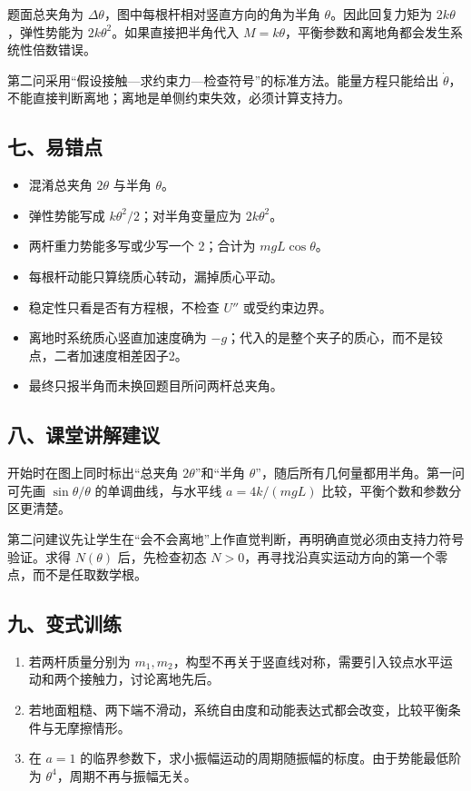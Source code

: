 \documentclass[12pt,a4paper,UTF8]{ctexart}
\newcommand{\tightlist}{\setlength{\itemsep}{0pt}\setlength{\parskip}{0pt}}
\begin{document}
题面总夹角为 \(\Delta\theta\)，图中每根杆相对竖直方向的角为半角
\(\theta\)。因此回复力矩为 \(2k\theta\)，弹性势能为
\(2k\theta^2\)。如果直接把半角代入
\(M=k\theta\)，平衡参数和离地角都会发生系统性倍数错误。

第二问采用``假设接触---求约束力---检查符号''的标准方法。能量方程只能给出
\(\dot\theta\)，不能直接判断离地；离地是单侧约束失效，必须计算支持力。

\subsection{七、易错点}\label{ux4e03ux6613ux9519ux70b9-7}

\begin{itemize}
\tightlist
\item
  混淆总夹角 \(2\theta\) 与半角 \(\theta\)。
\item
  弹性势能写成 \(k\theta^2/2\)；对半角变量应为 \(2k\theta^2\)。
\item
  两杆重力势能多写或少写一个 2；合计为 \(mgL\cos\theta\)。
\item
  每根杆动能只算绕质心转动，漏掉质心平动。
\item
  稳定性只看是否有方程根，不检查 \(U''\) 或受约束边界。
\item
  离地时系统质心竖直加速度确为
  \(-g\)；代入的是整个夹子的质心，而不是铰点，二者加速度相差因子2。
\item
  最终只报半角而未换回题目所问两杆总夹角。
\end{itemize}

\subsection{八、课堂讲解建议}\label{ux516bux8bfeux5802ux8bb2ux89e3ux5efaux8bae-7}

开始时在图上同时标出``总夹角 \(2\theta\)''和``半角
\(\theta\)''，随后所有几何量都用半角。第一问可先画 \(\sin\theta/\theta\)
的单调曲线，与水平线 \(a=4k/(mgL)\) 比较，平衡个数和参数分区更清楚。

第二问建议先让学生在``会不会离地''上作直觉判断，再明确直觉必须由支持力符号验证。求得
\(N(\theta)\) 后，先检查初态
\(N>0\)，再寻找沿真实运动方向的第一个零点，而不是任取数学根。

\subsection{九、变式训练}\label{ux4e5dux53d8ux5f0fux8badux7ec3-7}

\begin{enumerate}
\def\labelenumi{\arabic{enumi}.}
\tightlist
\item
  若两杆质量分别为
  \(m_1,m_2\)，构型不再关于竖直线对称，需要引入铰点水平运动和两个接触力，讨论离地先后。
\item
  若地面粗糙、两下端不滑动，系统自由度和动能表达式都会改变，比较平衡条件与无摩擦情形。
\item
  在 \(a=1\)
  的临界参数下，求小振幅运动的周期随振幅的标度。由于势能最低阶为
  \(\theta^4\)，周期不再与振幅无关。
\end{enumerate}
\end{document}
